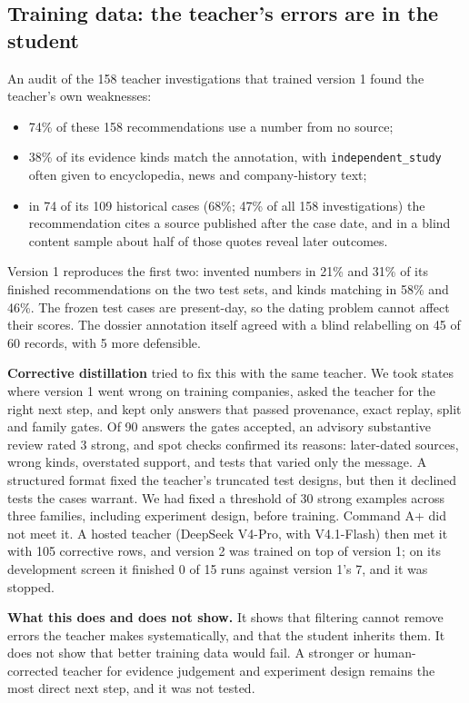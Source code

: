\subsection{Training data: the teacher's errors are in the student}
An audit of the 158 teacher investigations that trained version 1 found the teacher's own weaknesses:
\begin{itemize}
  \item 74\% of these 158 recommendations use a number from no source;
  \item 38\% of its evidence kinds match the annotation, with \texttt{independent\_study} often given to encyclopedia,
        news and company-history text;
  \item in 74 of its 109 historical cases (68\%; 47\% of all 158 investigations) the recommendation cites a source
        published after the case date, and in a blind content sample about half of those quotes reveal later outcomes.
\end{itemize}
Version 1 reproduces the first two: invented numbers in 21\% and 31\% of its finished recommendations on the two test
sets, and kinds matching in 58\% and 46\%. The frozen test cases are present-day, so the dating problem cannot affect
their scores. The dossier annotation itself agreed with a blind relabelling on 45 of 60 records, with 5 more
defensible.

\textbf{Corrective distillation} tried to fix this with the same teacher. We took states where version 1 went wrong on
training companies, asked the teacher for the right next step, and kept only answers that passed provenance, exact
replay, split and family gates. Of 90 answers the gates accepted, an advisory substantive review rated 3 strong, and
spot checks confirmed its reasons: later-dated sources, wrong kinds, overstated support, and tests that varied only
the message. A structured format fixed the teacher's truncated test designs, but then it declined tests the cases
warrant. We had fixed a threshold of 30 strong examples across three families, including experiment design, before
training. Command A+ did not meet it. A hosted teacher (DeepSeek V4-Pro, with V4.1-Flash) then met it with 105
corrective rows, and version 2 was trained on top of version 1; on its development screen it finished 0 of 15 runs
against version 1's 7, and it was stopped.

\textbf{What this does and does not show.} It shows that filtering cannot remove errors the teacher makes
systematically, and that the student inherits them. It does not show that better training data would fail. A stronger
or human-corrected teacher for evidence judgement and experiment design remains the most direct next step, and it was
not tested.
